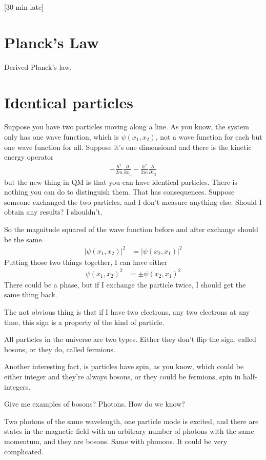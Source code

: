 [30 min late]
\section{Planck's Law}
Derived Planck's law.

\section{Identical particles}
Suppose you have two particles moving along a line.
As you know, the system only has one wave function,
which is $\psi(x_1,x_2)$,
not a wave function for each but one wave function for all.
Suppose it's one dimensional and there is the kinetic energy operator
\begin{align}
    -\frac{\hbar^2}{2m}\frac{\partial}{\partial x_1}
    -\frac{\hbar^2}{2m}\frac{\partial}{\partial x_2}
\end{align}
but the new thing in QM is that you can have identical particles.
There is nothing you can do to distinguish them.
That has consequences.
Suppose someone exchanged the two particles,
and I don't measure anything else.
Should I obtain any results?
I shouldn't.

So the magnitude squared of the wave function before and after exchange should
be the same.
\begin{align}
    |\psi(x_1, x_2)|^2 &= |\psi(x_2, x_1)|^2
\end{align}
Putting those two things together,
I can have either
\begin{align}
    \psi(x_1, x_2)^2 &= \pm\psi(x_2, x_1)^2
\end{align}
There could be a phase,
but if I exchange the particle twice, I should get the same thing back.

The not obvious thing is that if I have two electrons,
any two electrons at any time,
this sign is a property of the kind of particle.

All particles in the universe are two types.
Either they don't flip the sign,
called bosons,
or they do,
called fermions.

Another interesting fact,
is particles have spin, as you know,
which could be either integer and they're always bosons,
or they could be fermions, spin in half-integers.

Give me examples of bosons?
Photons.
How do we know?

Two photons of the same wavelength,
one particle mode is excited,
and there are states in the magnetic field with an arbitrary number of photons
with the same momentum,
and they are bosons.
Same with phonons.
It could be very complicated.

